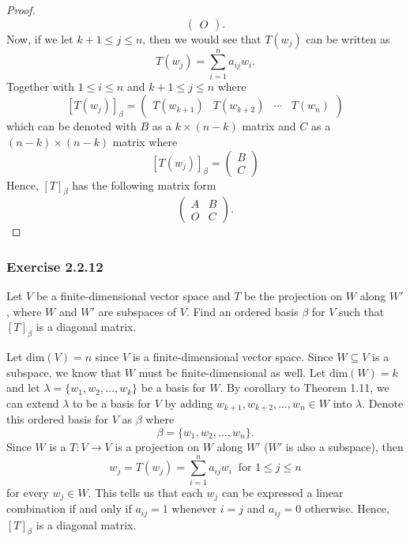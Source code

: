 \begin{proof}
\[\begin{pmatrix}
        O 
    \end{pmatrix}. \]
    Now, if we let \( k + 1 \leq j \leq n \), then we would see that \( T({w}_{j}) \) can be written as 
    \[  T({w}_{j}) = \sum_{ i=1 }^{ n } {a}_{ij} {w}_{i}. \]
Together with \( 1 \leq i \leq n  \) and \( k+1 \leq j \leq n   \) where 
\[  [T({w}_{j})]_{\beta} = \begin{pmatrix}
    T({w}_{k+1}) & T({w}_{k+2}) & \cdots & T({w}_{n})
\end{pmatrix}  \]
which can be denoted with \( B  \) as a \( k \times (n-k)  \) matrix and \( C  \) as a \( (n-k) \times (n-k)  \) matrix where  
    \[ 
        [T({w}_{j})]_{\beta} = \begin{pmatrix}
            B \\
            C
        \end{pmatrix}
    \]
Hence, \( {[T]}_{\beta} \) has the following matrix form
\[  \begin{pmatrix}
    A & B \\
    O & C 
\end{pmatrix}. \]
 \end{proof}

\subsubsection{Exercise 2.2.12} Let \( V  \) be a finite-dimensional vector space and \( T \) be the projection on \( W  \) along \( W' \), where \( W  \) and \( W'  \) are subspaces of \( V  \). Find an ordered basis \( \beta  \) for \( V  \) such that \( [T]_{\beta}^{}   \) is a diagonal matrix.
\begin{solution}
    Let \( \text{dim}(V) = n  \) since \( V \) is a finite-dimensional vector space. Since \( W \subseteq V  \) is a subspace, we know that \( W  \) must be finite-dimensional as well. Let \( \text{dim}(W) = k  \) and let \( \lambda = \{ {w}_{1}, {w}_{2}, \dots, {w}_{k } \}  \) be a basis for \( W  \). By corollary to Theorem 1.11, we can extend \( \lambda  \) to be a basis for \( V  \) by adding \( {w}_{k+1}, {w}_{k+2}, \dots, {w}_{n} \in W  \) into \( \lambda \). Denote this ordered basis for \( V  \) as \( \beta  \) where 
    \[  \beta = \{ {w}_{1}, {w}_{2}, \dots, {w}_{n} \}. \]
    Since \( W  \) is a \( T: V \to V  \) is a projection on \( W  \) along \( W' \) (\( W' \) is also a subspace), then
    \[ {w}_{j} =  T({w}_{j}) = \sum_{ i=1 }^{ n } {a}_{ij} {w}_{i} \ \text{ for } 1 \leq j \leq n  \]
    for every \( {w}_{j} \in W  \). This tells us that each \( {w}_{j}  \) can be expressed a linear combination if and only if \( {a}_{ij} = 1  \) whenever \( i = j  \) and \( {a}_{ij} = 0  \) otherwise. Hence, \( [T]_{\beta}^{}  \) is a diagonal matrix.  
\end{solution}

